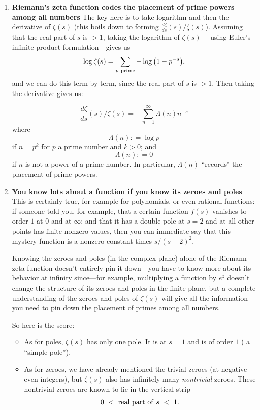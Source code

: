 \documentclass[openany]{book}
\theoremstyle{plain}
\theoremstyle{definition}
\newcommand{\todo}[1]{\par\vspace{1em}{\small---------\\{{\bf To be done:} #1}\\-----------}\par\vspace{1em}}
\begin{document}
  \begin{enumerate}\item {\bf Riemann's zeta function codes the
      placement of prime powers among all numbers} The key here is to
    take logarithm and then the derivative of $\zeta(s)$ (this boils
    down to forming ${\frac{d{\zeta}}{ds}}(s)/\zeta(s)$). Assuming
    that the real part of $s$ is $>1$, taking the logarithm of
    $\zeta(s)$ ---using Euler's infinite product formulation---gives
    us $$\log\zeta(s)= \sum_{p \ {\rm
        prime}}-\log{\big(1-p^{-s}\big)},$$ and we can do this
    term-by-term, since the real part of $s$ is $>1$.  Then taking the
    derivative gives us:

  \vskip20pt
   $${\frac{d{\zeta}}{ds}}(s)/\zeta(s)= -\sum_{n=1}^{\infty}\Lambda(n)n^{-s}$$ where  $$\Lambda(n): = \log p$$ if $n= p^k$ for $p$ a prime number and $k >0$;  and  $$\Lambda(n): = 0$$ if $n$ is not a power of a prime number.  In particular,  $\Lambda(n)$ ``records" the placement of prime powers.


 \vskip20pt

\item {\bf You know lots about a function if you know its zeroes and
    poles} This is certainly true, for example for polynomials, or
  even rational functions: if someone told you, for example, that a
  certain function $f(s)$ vanishes to order $1$ at $0$ and at
  $\infty$; and that it has a double pole at $s=2$ and at all other
  points has finite nonzero values, then you can immediate say that
  this mystery function is a nonzero constant times $s/(s-2)^2$.

  Knowing the zeroes and poles (in the complex plane) alone of the
  Riemann zeta function doesn't entirely pin it down---you have to
  know more about its behavior at infinity since---for example,
  multiplying a function by $e^z$ doesn't change the structure of its
  zeroes and poles in the finite plane.  but a complete understanding
  of the zeroes and poles of $\zeta(s)$ will give all the information
  you need to pin down the placement of primes among all numbers.

  So here is the score: 
  
  \begin{itemize} \item As for poles, $\zeta(s)$ has only one pole. It
    is at $s=1$ and is of order $1$ ( a ``simple pole'').\item As for
    zeroes, we have already mentioned the trivial zeroes (at negative
    even integers), but $\zeta(s)$ also has infinitely many {\it
      nontrivial} zeroes. These nontrivial zeroes are known to lie in
    the vertical strip $$0\ < \ {\rm real\ part\ of\ } s\ < \
    1.$$\end{itemize}

 \end{enumerate}
\end{document}
